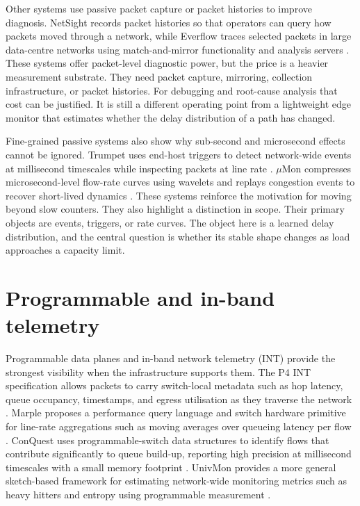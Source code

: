 Other systems use passive packet capture or packet histories to improve diagnosis. NetSight records packet histories so that operators can query how packets moved through a network, while Everflow traces selected packets in large data-centre networks using match-and-mirror functionality and analysis servers \cite{handigolNetSight,zhuEverflow}. These systems offer packet-level diagnostic power, but the price is a heavier measurement substrate. They need packet capture, mirroring, collection infrastructure, or packet histories. For debugging and root-cause analysis that cost can be justified. It is still a different operating point from a lightweight edge monitor that estimates whether the delay distribution of a path has changed.

Fine-grained passive systems also show why sub-second and microsecond effects cannot be ignored. Trumpet uses end-host triggers to detect network-wide events at millisecond timescales while inspecting packets at line rate \cite{moshrefTrumpet}. \(\mu\)Mon compresses microsecond-level flow-rate curves using wavelets and replays congestion events to recover short-lived dynamics \cite{zhengMuMon}. These systems reinforce the motivation for moving beyond slow counters. They also highlight a distinction in scope. Their primary objects are events, triggers, or rate curves. The object here is a learned delay distribution, and the central question is whether its stable shape changes as load approaches a capacity limit.

\section{Programmable and in-band telemetry}

Programmable data planes and in-band network telemetry (INT) provide the strongest visibility when the infrastructure supports them. The P4 INT specification allows packets to carry switch-local metadata such as hop latency, queue occupancy, timestamps, and egress utilisation as they traverse the network \cite{p4IntSpec}. Marple proposes a performance query language and switch hardware primitive for line-rate aggregations such as moving averages over queueing latency per flow \cite{narayanaMarple}. ConQuest uses programmable-switch data structures to identify flows that contribute significantly to queue build-up, reporting high precision at millisecond timescales with a small memory footprint \cite{chenConQuest}. UnivMon provides a more general sketch-based framework for estimating network-wide monitoring metrics such as heavy hitters and entropy using programmable measurement \cite{liuUnivMon}.

